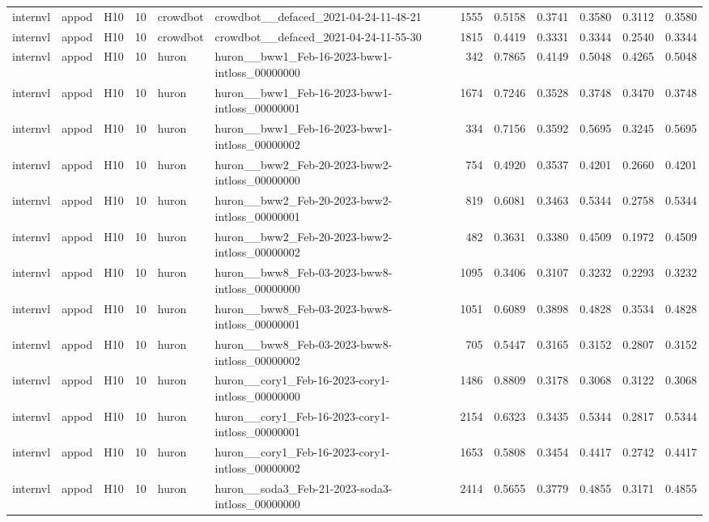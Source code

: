 \begin{table}[tbp]
\begin{tabular}{lllrllrrrrrr}
internvl & appod & H10 & 10 & crowdbot & crowdbot\_\_defaced\_2021-04-24-11-48-21 & 1555 & 0.5158 & 0.3741 & 0.3580 & 0.3112 & 0.3580 \\
internvl & appod & H10 & 10 & crowdbot & crowdbot\_\_defaced\_2021-04-24-11-55-30 & 1815 & 0.4419 & 0.3331 & 0.3344 & 0.2540 & 0.3344 \\
internvl & appod & H10 & 10 & huron & huron\_\_bww1\_Feb-16-2023-bww1-intloss\_00000000 & 342 & 0.7865 & 0.4149 & 0.5048 & 0.4265 & 0.5048 \\
internvl & appod & H10 & 10 & huron & huron\_\_bww1\_Feb-16-2023-bww1-intloss\_00000001 & 1674 & 0.7246 & 0.3528 & 0.3748 & 0.3470 & 0.3748 \\
internvl & appod & H10 & 10 & huron & huron\_\_bww1\_Feb-16-2023-bww1-intloss\_00000002 & 334 & 0.7156 & 0.3592 & 0.5695 & 0.3245 & 0.5695 \\
internvl & appod & H10 & 10 & huron & huron\_\_bww2\_Feb-20-2023-bww2-intloss\_00000000 & 754 & 0.4920 & 0.3537 & 0.4201 & 0.2660 & 0.4201 \\
internvl & appod & H10 & 10 & huron & huron\_\_bww2\_Feb-20-2023-bww2-intloss\_00000001 & 819 & 0.6081 & 0.3463 & 0.5344 & 0.2758 & 0.5344 \\
internvl & appod & H10 & 10 & huron & huron\_\_bww2\_Feb-20-2023-bww2-intloss\_00000002 & 482 & 0.3631 & 0.3380 & 0.4509 & 0.1972 & 0.4509 \\
internvl & appod & H10 & 10 & huron & huron\_\_bww8\_Feb-03-2023-bww8-intloss\_00000000 & 1095 & 0.3406 & 0.3107 & 0.3232 & 0.2293 & 0.3232 \\
internvl & appod & H10 & 10 & huron & huron\_\_bww8\_Feb-03-2023-bww8-intloss\_00000001 & 1051 & 0.6089 & 0.3898 & 0.4828 & 0.3534 & 0.4828 \\
internvl & appod & H10 & 10 & huron & huron\_\_bww8\_Feb-03-2023-bww8-intloss\_00000002 & 705 & 0.5447 & 0.3165 & 0.3152 & 0.2807 & 0.3152 \\
internvl & appod & H10 & 10 & huron & huron\_\_cory1\_Feb-16-2023-cory1-intloss\_00000000 & 1486 & 0.8809 & 0.3178 & 0.3068 & 0.3122 & 0.3068 \\
internvl & appod & H10 & 10 & huron & huron\_\_cory1\_Feb-16-2023-cory1-intloss\_00000001 & 2154 & 0.6323 & 0.3435 & 0.5344 & 0.2817 & 0.5344 \\
internvl & appod & H10 & 10 & huron & huron\_\_cory1\_Feb-16-2023-cory1-intloss\_00000002 & 1653 & 0.5808 & 0.3454 & 0.4417 & 0.2742 & 0.4417 \\
internvl & appod & H10 & 10 & huron & huron\_\_soda3\_Feb-21-2023-soda3-intloss\_00000000 & 2414 & 0.5655 & 0.3779 & 0.4855 & 0.3171 & 0.4855 \\

\end{tabular}
\end{table}
